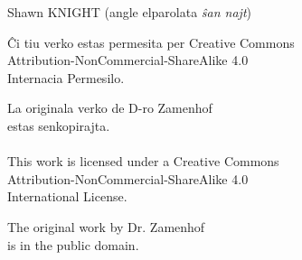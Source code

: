 \documentclass[12pt,twoside]{book}
\begin{document}
\vspace{1ex}

{\setlength{\parindent}{0em}
Shawn KNIGHT (angle elparolata \emph{ŝan najt})\\
\hodiau}

\newpage
\thispagestyle{empty}
\vspace*{\fill}
\begin{center}
Ĉi tiu verko estas permesita per Creative Commons \\
Attribution-NonCommercial-ShareAlike 4.0 \\
Internacia Permesilo.

La originala verko de D-ro Zamenhof \\
estas senkopirajta.\\[1ex]

\ccbyncsa\\[1ex]

This work is licensed under a Creative Commons \\
Attribution-NonCommercial-ShareAlike 4.0 \\
International License.

The original work by Dr. Zamenhof \\
is in the public domain.
\vspace*{\fill}
\end{center}
\end{document}
